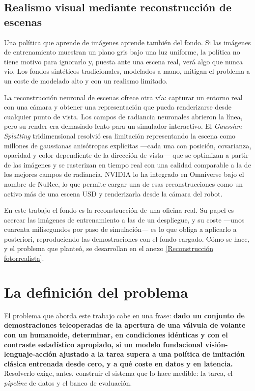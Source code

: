 \subsection{Realismo visual mediante reconstrucción de escenas}
\label{sec:gs-estado}

Una política que aprende de imágenes aprende también del fondo. Si las imágenes de entrenamiento
muestran un plano gris bajo una luz uniforme, la política no tiene motivo para ignorarlo y, puesta
ante una escena real, verá algo que nunca vio. Los fondos sintéticos tradicionales, modelados a mano,
mitigan el problema a un coste de modelado alto y con un realismo limitado.

La reconstrucción neuronal de escenas ofrece otra vía: capturar un entorno real con una cámara y
obtener una representación que pueda renderizarse desde cualquier punto de vista. Los campos de
radiancia neuronales abrieron la línea, pero su render era demasiado lento para un simulador
interactivo. El \textit{Gaussian Splatting} tridimensional \cite{kerbl2023gaussian} resolvió esa
limitación representando la escena como millones de gaussianas anisótropas explícitas —cada una con
posición, covarianza, opacidad y color dependiente de la dirección de vista— que se optimizan a
partir de las imágenes y se rasterizan en tiempo real con una calidad comparable a la de los mejores
campos de radiancia. NVIDIA lo ha integrado en Omniverse bajo el nombre de NuRec, lo que permite
cargar una de esas reconstrucciones como un activo más de una escena USD y renderizarla desde la
cámara del robot.

En este trabajo el fondo es la reconstrucción de una oficina real. Su papel es acercar las imágenes
de entrenamiento a las de un despliegue, y su coste —unos cuarenta milisegundos por paso de
simulación— es lo que obliga a aplicarlo a posteriori, reproduciendo las demostraciones con el
fondo cargado. Cómo se hace, y el problema que planteó, se desarrollan en el anexo
\ref{Reconstrucción fotorrealista}.


\section{La definición del problema}

El problema que aborda este trabajo cabe en una frase: \textbf{dado un conjunto de demostraciones
teleoperadas de la apertura de una válvula de volante con un humanoide, determinar, en condiciones
idénticas y con el contraste estadístico apropiado, si un modelo fundacional visión-lenguaje-acción
ajustado a la tarea supera a una política de imitación clásica entrenada desde cero, y a qué coste
en datos y en latencia.} Resolverlo exige, antes, construir el sistema que lo hace medible: la
tarea, el \textit{pipeline} de datos y el banco de evaluación.

